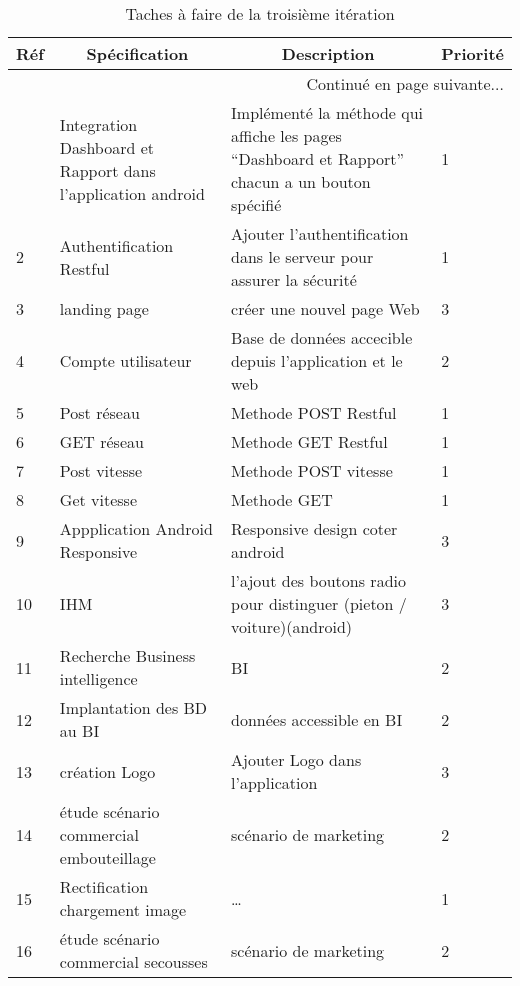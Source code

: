 \begin{center}
    \footnotesize
    \begin{longtable}{| p{1cm} | p{5cm} | p{7cm} | p{1cm} |}
        \caption{Taches à faire de la troisième itération}
        \label{tab:sprint3-backlog} \\

 \hline
 \multicolumn{1}{|c}{\textbf{Réf}} &
 \multicolumn{1}{|c}{\textbf{Spécification}} &
 \multicolumn{1}{|c}{\textbf{Description}} &
 \multicolumn{1}{|c|}{\textbf{Priorité}} \\ \hline
 \endhead

 \hline \multicolumn{4}{|r|}{{Continué en page suivante$\dotsc$}} \\ \hline
 \endfoot

 \hline \hline
 \endlastfoot

\hline
1 & Integration Dashboard et Rapport dans l'application android & Implémenté la méthode qui affiche les pages ``Dashboard et Rapport'' chacun a un bouton spécifié   & 1 \\ \hline
2 & Authentification Restful  & Ajouter l'authentification dans le serveur pour assurer la sécurité   & 1 \\ \hline
3 & landing page & créer une nouvel page Web  & 3\\ \hline
4 & Compte utilisateur & Base de données accecible depuis l'application et le web& 2 \\ \hline
5 & Post réseau & Methode POST Restful & 1 \\ \hline
6 & GET réseau & Methode GET Restful & 1 \\ \hline
7 & Post vitesse & Methode POST vitesse & 1 \\ \hline
8 & Get vitesse & Methode GET & 1 \\ \hline
9 & Appplication Android Responsive & Responsive design coter android & 3 \\ \hline
10 & IHM & l'ajout des boutons radio pour distinguer (pieton / voiture)(android) & 3 \\ \hline
11 & Recherche Business intelligence & BI & 2 \\ \hline
12 & Implantation des BD au BI & données accessible en BI & 2\\ \hline
13 & création Logo &Ajouter Logo dans l'application & 3 \\ \hline
14 & étude scénario commercial embouteillage & scénario de marketing& 2\\ \hline
15 & Rectification chargement image & \ldots & 1 \\ \hline
16 & étude scénario commercial secousses & scénario de marketing& 2\\ \hline
\end{longtable}
\end{center}


